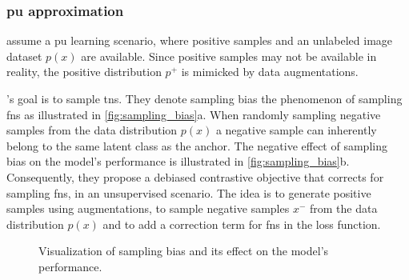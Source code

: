 \subsubsection{\ac{pu} approximation}\label{subsec:pu_approximation}

\citet{chuang_debiased_2020} assume a \ac{pu} learning scenario, 
where positive samples and an unlabeled image dataset $p(x)$ are available.
Since positive samples may not be available in reality, 
the positive distribution $p^+$ is mimicked by data augmentations.

\citeauthor{chuang_debiased_2020}'s goal is to sample \acp{tn}.
They denote sampling bias the phenomenon of sampling \acp{fn} as illustrated in \autoref{fig:sampling_bias}a.
When randomly sampling negative samples from the data distribution $p(x)$ 
a negative sample can inherently belong to the same latent class as the anchor.
The negative effect of sampling bias on the model's performance is illustrated in \autoref{fig:sampling_bias}b.
Consequently, they propose a debiased contrastive objective that corrects for sampling \acp{fn}, 
in an unsupervised scenario.
The idea is to generate positive samples using augmentations,
to sample negative samples $x^-$ from the data distribution $p(x)$
and to add a correction term for \acp{fn} in the loss function.

\begin{figure}%
    \centering
    \qquad
    \caption{Visualization of sampling bias and its effect on the model's performance.}%
    \label{fig:sampling_bias}%
\end{figure}